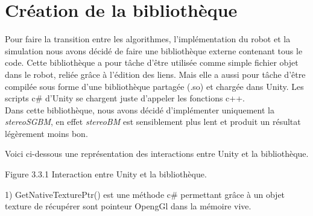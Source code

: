 \documentclass[12pt,a4paper]{report}
\begin{document}
\section{Création de la bibliothèque}
Pour faire la transition entre les algorithmes, l'implémentation du robot et la simulation nous avons décidé de faire une bibliothèque externe contenant tous le code.
Cette bibliothèque a pour tâche d'être utilisée comme simple fichier objet dans le robot, reliée grâce à l'édition des liens. Mais elle a aussi pour tâche d'être compilée sous forme d'une bibliothèque partagée (.so) et chargée dans Unity. Les scripts c\# d'Unity se chargent juste d'appeler les fonctions c++.\\
Dans cette bibliothèque, nous avons décidé d'implémenter uniquement la \textit{stereoSGBM}, en effet \textit{stereoBM} est sensiblement plus lent et produit un résultat légèrement moins bon.

Voici ci-dessous une représentation des interactions entre Unity et la bibliothèque.
\begin{center}

Figure 3.3.1 Interaction entre Unity et la bibliothèque.\\
\end{center}
\begin{small}
1) GetNativeTexturePtr() est une méthode c\# permettant grâce à un objet texture de récupérer sont pointeur OpengGl dans la mémoire vive.
\end{small}
\end{document}

